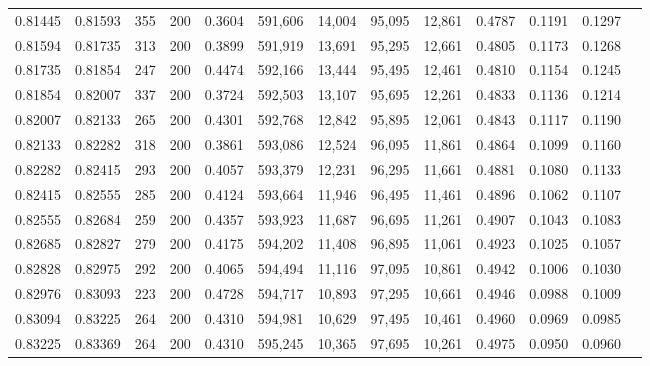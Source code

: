 \begin{tabular}{rrrrrrrrrrrrr}
0.81445 & 0.81593 &   355 & 200 &                                     0.3604 & 591,606 &  14,004 &  95,095 &  12,861 & 0.4787 & 0.1191 & 0.1297 \\
0.81594 & 0.81735 &   313 & 200 &                                     0.3899 & 591,919 &  13,691 &  95,295 &  12,661 & 0.4805 & 0.1173 & 0.1268 \\
0.81735 & 0.81854 &   247 & 200 &                                     0.4474 & 592,166 &  13,444 &  95,495 &  12,461 & 0.4810 & 0.1154 & 0.1245 \\
0.81854 & 0.82007 &   337 & 200 &                                     0.3724 & 592,503 &  13,107 &  95,695 &  12,261 & 0.4833 & 0.1136 & 0.1214 \\
0.82007 & 0.82133 &   265 & 200 &                                     0.4301 & 592,768 &  12,842 &  95,895 &  12,061 & 0.4843 & 0.1117 & 0.1190 \\
0.82133 & 0.82282 &   318 & 200 &                                     0.3861 & 593,086 &  12,524 &  96,095 &  11,861 & 0.4864 & 0.1099 & 0.1160 \\
0.82282 & 0.82415 &   293 & 200 &                                     0.4057 & 593,379 &  12,231 &  96,295 &  11,661 & 0.4881 & 0.1080 & 0.1133 \\
0.82415 & 0.82555 &   285 & 200 &                                     0.4124 & 593,664 &  11,946 &  96,495 &  11,461 & 0.4896 & 0.1062 & 0.1107 \\
0.82555 & 0.82684 &   259 & 200 &                                     0.4357 & 593,923 &  11,687 &  96,695 &  11,261 & 0.4907 & 0.1043 & 0.1083 \\
0.82685 & 0.82827 &   279 & 200 &                                     0.4175 & 594,202 &  11,408 &  96,895 &  11,061 & 0.4923 & 0.1025 & 0.1057 \\
0.82828 & 0.82975 &   292 & 200 &                                     0.4065 & 594,494 &  11,116 &  97,095 &  10,861 & 0.4942 & 0.1006 & 0.1030 \\
0.82976 & 0.83093 &   223 & 200 &                                     0.4728 & 594,717 &  10,893 &  97,295 &  10,661 & 0.4946 & 0.0988 & 0.1009 \\
0.83094 & 0.83225 &   264 & 200 &                                     0.4310 & 594,981 &  10,629 &  97,495 &  10,461 & 0.4960 & 0.0969 & 0.0985 \\
0.83225 & 0.83369 &   264 & 200 &                                     0.4310 & 595,245 &  10,365 &  97,695 &  10,261 & 0.4975 & 0.0950 & 0.0960 \\

\end{tabular}
